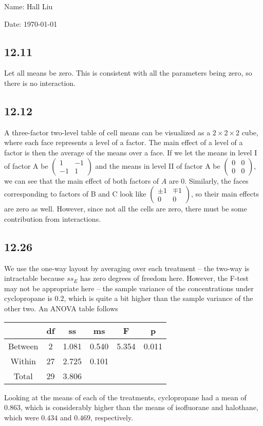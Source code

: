 \documentclass{article}
\newcommand{\openm}{\begin{pmatrix}}
\newcommand{\closem}{\end{pmatrix}}
\begin{document}
Name: Hall Liu

Date: \today 
\vspace{1.5cm}

\subsection*{12.11}
Let all means be zero. This is consistent with all the parameters being zero, so there is no interaction.
\subsection*{12.12}
A three-factor two-level table of cell means can be visualized as a $2\times2\times2$ cube, where each face represents a level of a factor. The main effect of a level of a factor is then the average of the means over a face. If we let the means in level I of factor A be $\openm1&-1\\-1&1\closem$ and the means in level II of factor A be $\openm0&0\\0&0\closem$, we can see that the main effect of both factors of $A$ are $0$. Similarly, the faces corresponding to factors of B and C look like $\openm\pm1&\mp1\\0&0\closem$, so their main effects are zero as well. However, since not all the cells are zero, there must be some contribution from interactions.
\subsection*{12.26}
We use the one-way layout by averaging over each treatment -- the two-way is intractable because $ss_E$ has zero degrees of freedom here. However, the F-test may not be appropriate here -- the sample variance of the concentrations under cyclopropane is $0.2$, which is quite a bit higher than the sample variance of the other two. An ANOVA table follows

\begin{tabular}{cccccc}
&df&ss&ms&F&p\\
\hline
Between&2&1.081&0.540&5.354&0.011\\
Within&27&2.725&0.101\\
Total&29&3.806\\
\end{tabular}

Looking at the means of each of the treatments, cyclopropane had a mean of $0.863$, which is considerably higher than the means of isofluorane and halothane, which were $0.434$ and $0.469$, respectively.
\end{document}
